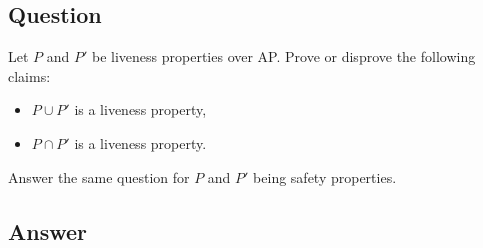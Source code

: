 \documentclass[12pt]{article}
\begin{document}
\subsection*{Question}
Let $P$ and $P'$ be liveness properties over AP. Prove or disprove the following
claims:
\begin{itemize}
	\item $P \cup P'$ is a liveness property,
	\item $P \cap P'$ is a liveness property.
\end{itemize}
Answer the same question for $P$ and $P'$ being safety properties.

\subsection*{Answer}
\end{document}
